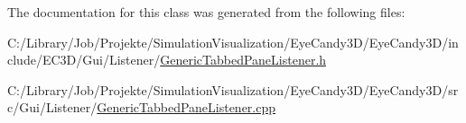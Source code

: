 The documentation for this class was generated from the following files\+:\begin{DoxyCompactItemize}
\item 
C\+:/\+Library/\+Job/\+Projekte/\+Simulation\+Visualization/\+Eye\+Candy3\+D/\+Eye\+Candy3\+D/include/\+E\+C3\+D/\+Gui/\+Listener/\mbox{\hyperlink{_generic_tabbed_pane_listener_8h}{Generic\+Tabbed\+Pane\+Listener.\+h}}\item 
C\+:/\+Library/\+Job/\+Projekte/\+Simulation\+Visualization/\+Eye\+Candy3\+D/\+Eye\+Candy3\+D/src/\+Gui/\+Listener/\mbox{\hyperlink{_generic_tabbed_pane_listener_8cpp}{Generic\+Tabbed\+Pane\+Listener.\+cpp}}\end{DoxyCompactItemize}

